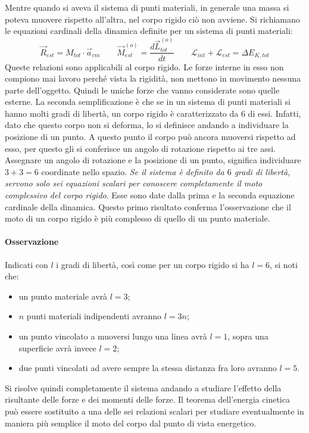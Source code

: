 \documentclass[10pt,a4paper]{book}
\begin{document}
Mentre quando si aveva il sistema di punti materiali, in generale una massa si poteva muovere rispetto all'altra, nel corpo rigido ciò non avviene. Si richiamano le equazioni cardinali della dinamica definite per un sistema di punti materiali:
\[
	\boxed{\vec{R}_{est} = M_{tot}\cdot \vec{a}_{cm} \qquad \vec{M}^{(o)}_{est} = \frac{d\vec{L}^{(o)}_{tot}}{dt} \qquad \mathcal{L}_{int} + \mathcal{L}_{est} = \Delta E_{K,tot}   }
\]
Queste relazioni sono applicabili al corpo rigido. Le forze interne in esso non compiono mai lavoro perché vista la rigidità, non mettono in movimento nessuna parte dell'oggetto. Quindi le uniche forze che vanno considerate sono quelle esterne. La seconda semplificazione è che se in un sistema di punti materiali si hanno molti gradi di libertà,  un corpo rigido è caratterizzato da $6$ di essi. Infatti, dato che questo corpo non si deforma, lo si definisce andando a individuare la posizione di un punto. A questo punto il corpo può ancora muoversi rispetto ad esso, per questo gli si conferisce un angolo di rotazione rispetto ai tre assi. Assegnare un angolo di rotazione e la posizione di un punto, significa individuare $3+3=6$ coordinate nello spazio. \emph{Se il sistema è definito da $6$ gradi di libertà, servono solo sei equazioni scalari per conoscere completamente il moto complessivo del corpo rigido}. Esse sono date dalla prima e la seconda equazione cardinale della dinamica. Questo primo risultato conferma l'osservazione che il moto di un corpo rigido è più complesso di quello di un punto materiale.

\paragraph{Osservazione} Indicati con $l$ i gradi di libertà, così come per un corpo rigido si ha $l=6$, si noti che:
\begin{itemize}
	\item un punto materiale avrà $l=3$;
	\item $n$ punti materiali indipendenti avranno $l=3n$;
	\item un punto vincolato a muoversi lungo una linea avrà $l=1$, sopra una superficie avrà invece $l=2$;
	\item due punti vincolati ad avere sempre la stessa distanza fra loro avranno $l=5$.
\end{itemize}
Si risolve quindi completamente il sistema andando a studiare l'effetto della risultante delle forze e dei momenti delle forze. Il teorema dell'energia cinetica può essere sostituito a una delle sei relazioni scalari per studiare eventualmente in maniera più semplice il moto del corpo dal punto di vista energetico.
\end{document}

